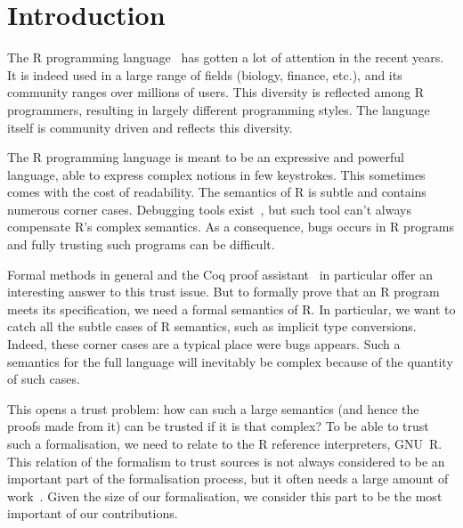 \documentclass[
    sigplan,
    10pt,
    review, %
    natbib=false %
 ]{acmart}
\newcommand{\mb}[1]{\todo[color=purple!20,size=\scriptsize]{#1}}
\begin{document}

\maketitle

\section{Introduction}
\label{sec:intro}

The R programming language~\parencite{R, ihaka1996r, Rwebsite}
has gotten a lot of attention in the recent years.
It is indeed used in a large range of fields (biology, finance, etc.),
and its community ranges over millions of users.
This diversity is reflected among R programmers,
resulting in largely different programming styles.
The language itself is community driven and reflects this diversity.

The R programming language is meant to be an expressive and powerful language,
able to express complex notions in few keystrokes.
This sometimes comes with the cost of readability.
The semantics of R is subtle and contains numerous corner cases.
\mb{An small example would be nice here.}
%
Debugging tools exist~\parencite{mcpherson2014},
but such tool can’t always compensate R’s complex semantics.
As a consequence, bugs occurs in R programs
and fully trusting such programs can be difficult.

Formal methods in general and the Coq proof assistant~\parencite{Coq}
in particular offer an interesting answer to this trust issue.
But to formally prove that an R program meets its specification,
we need a formal semantics of R.
In particular, we want to catch all the subtle cases of R semantics,
such as implicit type conversions.
Indeed, these corner cases are a typical place were bugs appears.
Such a semantics for the full language will inevitably be complex
because of the quantity of such cases.

This opens a trust problem:
how can such a large semantics (and hence the proofs made from it)
can be trusted if it is that complex?
To be able to trust such a formalisation,
we need to relate to the R reference interpreters, GNU~R.
This relation of the formalism to trust sources
is not always considered to be an important part of the formalisation process,
but it often needs a large amount of work~\parencite{leroy2014pip}.
Given the size of our formalisation,
we consider this part to be the most important of our contributions.
\end{document}
